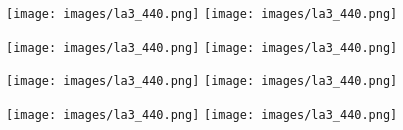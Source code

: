 \documentclass[12pt,a4paper]{article}
\begin{document}
\texttt{[image: images/la3\_440.png]}
\hfill{}
\texttt{[image: images/la3\_440.png]}

\vfill{}

\texttt{[image: images/la3\_440.png]}
\hfill
\texttt{[image: images/la3\_440.png]}

\vfill{}


\texttt{[image: images/la3\_440.png]}
\hfill
\texttt{[image: images/la3\_440.png]}

\vfill{}


\texttt{[image: images/la3\_440.png]}
\hfill
\texttt{[image: images/la3\_440.png]}
\end{document}
